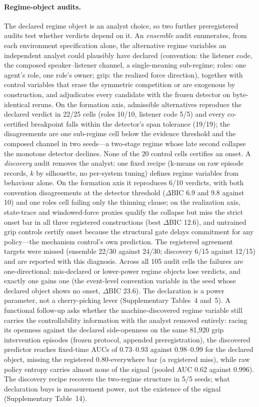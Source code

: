 \documentclass[11pt]{article}
\begin{document}
\paragraph{Regime-object audits.}
The declared regime object is an analyst choice, so two further
preregistered audits test whether verdicts depend on it. An
\emph{ensemble} audit enumerates, from each environment specification
alone, the alternative regime variables an independent analyst could
plausibly have declared (convention: the listener code, the composed
speaker--listener channel, a single-meaning sub-regime; roles: one
agent's role, one role's owner; grip: the realized force direction),
together with control variables that erase the symmetric competition
or are exogenous by construction, and adjudicates every candidate with
the frozen detector on byte-identical reruns. On the formation axis,
admissible alternatives reproduce the declared verdict in 22/25 cells
(roles 10/10, listener code 5/5) and every co-certified breakpoint
falls within the detector's span tolerance (19/19); the disagreements
are one sub-regime cell below the evidence threshold and the composed
channel in two seeds---a two-stage regime whose late second collapse
the monotone detector declines. None of the 20 control cells certifies
an onset. A \emph{discovery} audit removes the analyst: one fixed
recipe (k-means on raw episode records, $k$ by silhouette, no
per-system tuning) defines regime variables from behaviour alone. On
the formation axis it reproduces 6/10 verdicts, with both convention
disagreements at the detector threshold ($\Delta$BIC 6.9 and 9.8
against 10) and one roles cell failing only the thinning clause; on
the realization axis, state-trace and windowed-force proxies qualify
the collapse but miss the strict onset bar in all three registered
constructions (best $\Delta$BIC 12.6), and untrained grip controls
certify onset because the structural gate delays commitment for any
policy---the mechanism control's own prediction. The registered
agreement targets were missed (ensemble 22/30 against 24/30; discovery
6/15 against 12/15) and are reported with this diagnosis. Across all
105 audit cells the failures are one-directional: mis-declared or
lower-power regime objects lose verdicts, and exactly one gains one
(the event-level convention variable in the seed whose declared object
shows no onset, $\Delta$BIC 23.6). The declaration is a power
parameter, not a cherry-picking lever (Supplementary Tables~4
and~5). A functional follow-up asks whether the machine-discovered
regime variable still carries the controllability information with
the analyst removed entirely: racing its openness against the
declared side-openness on the same 81{,}920 grip intervention
episodes (frozen protocol, appended preregistration), the discovered
predictor reaches fixed-time AUCs of
0.73--0.93 against 0.98--0.99 for the declared object, missing the
registered 0.80-everywhere bar (a registered miss), while raw policy
entropy carries almost none of the signal (pooled AUC 0.62 against
0.996). The discovery recipe recovers the two-regime structure in
5/5 seeds; what declaration buys is measurement power, not the
existence of the signal (Supplementary Table~14).
\end{document}
